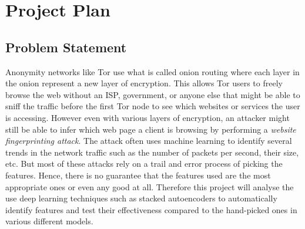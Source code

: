 \newpage
\section{Project Plan}

\setcounter{secnumdepth}{5}
\begingroup

\renewcommand{\thesubsection}{\arabic{subsection}}

\renewcommand{\addcontentsline}[3]{}%

\subsection{Problem Statement}
Anonymity networks like Tor use what is called onion routing where each layer in the onion represent a new layer of encryption.
This allows Tor users to freely browse the web without an ISP, government, or anyone else that might be able to sniff the traffic before the first Tor node to see which websites or services the user is accessing.
However even with various layers of encryption, an attacker might still be able to infer which web page a client is browsing by performing a \textit{website fingerprinting attack}.
The attack often uses machine learning to identify several trends in the network traffic such as the number of packets per second, their size, etc.
But most of these attacks rely on a trail and error process of picking the features.
Hence, there is no guarantee that the features used are the most appropriate ones or even any good at all.
Therefore this project will analyse the use deep learning techniques such as stacked autoencoders to automatically identify features and test their effectiveness compared to the hand-picked ones in various different models.

